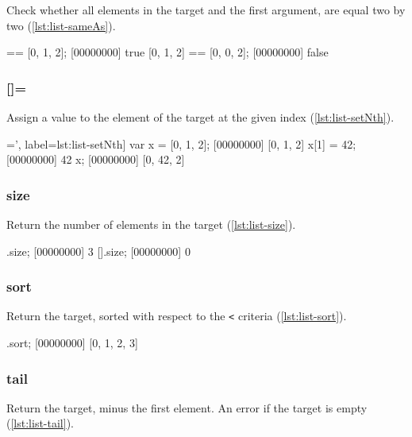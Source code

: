 Check whether all elements in the target and the first argument, are
equal two by two (\autoref{lst:list-sameAs}).

\begin{urbiscript}[caption={List.==}, label=lst:list-sameAs]
[0, 1, 2] == [0, 1, 2];
[00000000] true
[0, 1, 2] == [0, 0, 2];
[00000000] false
\end{urbiscript}

\subsubsection{[]=}
\label{sec:std-list-setnth}

Assign a value to the element of the target at the given index
(\autoref{lst:list-setNth}).

\begin{urbiscript}[caption=List.'[]=', label=lst:list-setNth]
var x = [0, 1, 2];
[00000000] [0, 1, 2]
x[1] = 42;
[00000000] 42
x;
[00000000] [0, 42, 2]
\end{urbiscript}

\subsubsection{size}

Return the number of elements in the target (\autoref{lst:list-size}).

\begin{urbiscript}[caption=List.size, label=lst:list-size]
[1, 2, 3].size;
[00000000] 3
[].size;
[00000000] 0
\end{urbiscript}

\subsubsection{sort}

Return the target, sorted with respect to the \lstinline|<| criteria
(\autoref{lst:list-sort}).

\begin{urbiscript}[caption=List.sort, label=lst:list-sort]
[1, 0, 3, 2].sort;
[00000000] [0, 1, 2, 3]
\end{urbiscript}

\subsubsection{tail}

Return the target, minus the first element. An error if the target is
empty (\autoref{lst:list-tail}).

